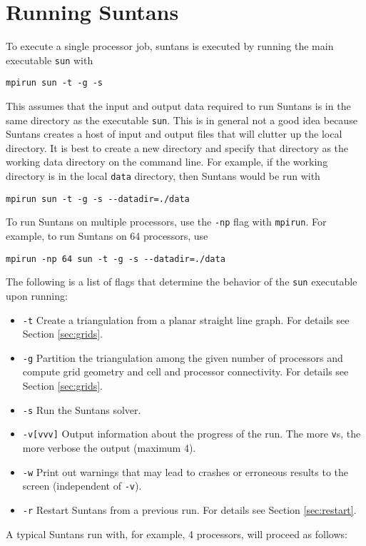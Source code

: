 \documentclass[12pt,oneside]{article}
\begin{document}
\section{Running Suntans}

To execute a single processor job, suntans is executed by running the main executable \verb+sun+ with
\begin{verbatim}
mpirun sun -t -g -s 
\end{verbatim}
This assumes that the input and output data required to run Suntans is in the same directory
as the executable \verb+sun+.  This is in general not a good idea because Suntans creates a host
of input and output files that will clutter up the local directory.  It is best to create a new
directory and specify that directory as the working data directory on the command line.  For
example, if the working directory is in the local \verb+data+ directory, then Suntans would be
run with
\begin{verbatim}
mpirun sun -t -g -s --datadir=./data
\end{verbatim}
To run Suntans on multiple processors, use the \verb+-np+ flag with \verb+mpirun+. For example,
to run Suntans on 64 processors, use
\begin{verbatim}
mpirun -np 64 sun -t -g -s --datadir=./data
\end{verbatim}
The following is a list of flags that determine the behavior of the \verb+sun+ executable upon
running:
\begin{itemize}
\item{\verb+-t+} Create a triangulation from a planar straight line graph.  For details see
Section \ref{sec:grids}.
\item{\verb+-g+} Partition the triangulation among the given number of processors and
compute grid geometry and cell and processor connectivity.  For details see Section \ref{sec:grids}.
\item{\verb+-s+} Run the Suntans solver.
\item{\verb+-v[vvv]+} Output information about the progress of the run.  The more \verb+v+s, the
more verbose the output (maximum 4).
\item{\verb+-w+} Print out warnings that may lead to crashes or erroneous results to the screen
(independent of \verb+-v+).
\item{\verb+-r+} Restart Suntans from a previous run.  For details see Section \ref{sec:restart}.
\end{itemize}
A typical Suntans run with, for example, 4 processors, will proceed as follows:
\end{document}
